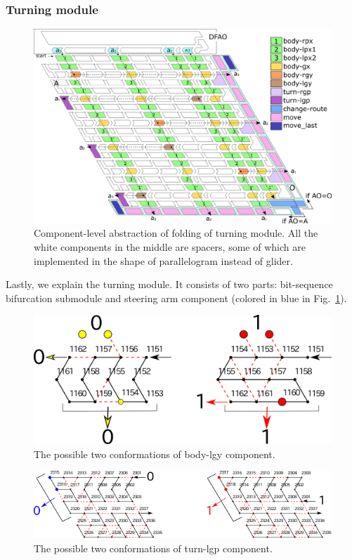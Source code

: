 			\subsubsection{Turning module}

\begin{figure}[t]
\centering
\includegraphics[width=\linewidth]{pic/overall_turn_part.pdf}
\caption{
Component-level abstraction of folding of turning module.
All the white components in the middle are spacers, some of which are implemented in the shape of parallelogram instead of glider. 
 }
\label{fig:overall_turning}
\end{figure}

Lastly, we explain the turning module. 
It consists of two parts: bit-sequence bifurcation submodule and steering arm component (colored in blue in Fig.~\ref{fig:overall_turning}). 


\begin{figure}[h]
\centering
\includegraphics[width=0.5\linewidth]{pic/body-lgy.png}
\caption{The possible two conformations of body-lgy component.}
\label{fig:body-lgy}
\end{figure}

\begin{figure}[h]
\centering
\includegraphics[width=0.8\linewidth]{pic/turn-lgp.pdf}
\caption{The possible two conformations of turn-lgp component.}
\label{fig:turn-lgp}
\end{figure}



